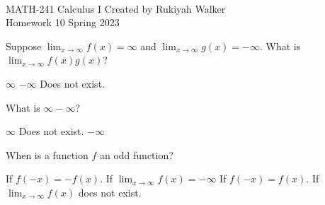 \documentclass[addpoints, 12pt]{exam}%
\newcommand{\spc}{\vspace*{0.5cm}}
\begin{document}
\noindent \hrulefill \\
	MATH-241 Calculus I \hfill Created by Rukiyah Walker\\
	Homework 10 \hfill Spring 2023\\ \vspace*{-1cm}
 
	\noindent\hrulefill


\begin{questions}

\vspace*{0.5cm}

\question[1]

Suppose $\lim_{x \to \infty} f(x) = \infty$ and $\lim_{x \to \infty} g(x) = -\infty$. What is $\lim_{x \to \infty} f(x)g(x)$?

\begin{multicols}{2}
\begin{choices}
\choice $\infty$
\CorrectChoice $-\infty$
\choice Does not exist.
\end{choices}
\end{multicols}

\spc

\question[1]

What is $\infty - \infty$?

\begin{multicols}{2}
\begin{choices}
\choice $\infty$
\CorrectChoice Does not exist.
\choice $-\infty$
\end{choices}
\end{multicols}

\spc

\question[1]

When is a function $f$ an odd function? 

\begin{multicols}{2}
\begin{choices}
\CorrectChoice If $f(-x) = -f(x)$.
\choice If $\lim_{x \to \infty} f(x) = -\infty$ 
\choice If $f(-x) = f(x)$.
\choice If $\lim_{x \to \infty} f(x)$ does not exist.
\end{choices}
\end{multicols}


\end{questions}
\end{document}
